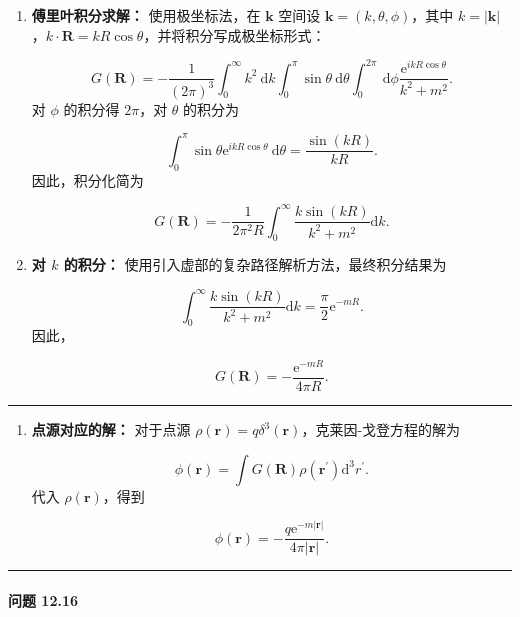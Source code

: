\begin{enumerate}
\def\labelenumi{\arabic{enumi}.}
\item
  \textbf{傅里叶积分求解：} 使用极坐标法，在 $\mathbf{k}$ 空间设
  $\mathbf{k}=(k, \theta, \phi)$，其中
  $k=|\mathbf{k}|$，$k \cdot \mathbf{R}=k R \cos\theta$，并将积分写成极坐标形式：

  $$
  G(\mathbf{R})=-\frac{1}{(2 \pi)^{3}} \int_{0}^{\infty} k^{2} \mathrm{~d} k \int_{0}^{\pi} \sin \theta \mathrm{~d} \theta \int_{0}^{2 \pi} \mathrm{~d} \phi \frac{\mathrm{e}^{i k R \cos \theta}}{k^{2}+m^{2}}.
  $$
  对 $\phi$ 的积分得 $2 \pi$，对 $\theta$ 的积分为

  $$
  \int_{0}^{\pi} \sin \theta \mathrm{e}^{i k R \cos \theta} \mathrm{~d} \theta = \frac{\sin(k R)}{k R}.
  $$
  因此，积分化简为

  $$
  G(\mathbf{R})=-\frac{1}{2 \pi^{2} R} \int_{0}^{\infty} \frac{k \sin(k R)}{k^{2}+m^{2}} \mathrm{d} k.
  $$
\item
  \textbf{对 $k$ 的积分：}
  使用引入虚部的复杂路径解析方法，最终积分结果为

  $$
  \int_{0}^{\infty} \frac{k \sin(k R)}{k^{2}+m^{2}} \mathrm{d} k = \frac{\pi}{2} \mathrm{e}^{-m R}.
  $$
  因此，

  $$
  G(\mathbf{R})=-\frac{\mathrm{e}^{-m R}}{4 \pi R}.
  $$
\end{enumerate}

\begin{center}\rule{0.5\linewidth}{0.5pt}\end{center}

\begin{enumerate}
\def\labelenumi{\arabic{enumi}.}
\setcounter{enumi}{2}
\item
  \textbf{点源对应的解：} 对于点源
  $\rho(\mathbf{r})=q \delta^{3}(\mathbf{r})$，克莱因-戈登方程的解为

  $$
  \phi(\mathbf{r}) = \int G(\mathbf{R}) \rho(\mathbf{r}^{\prime}) \mathrm{d}^{3} r^{\prime}.
  $$
  代入 $\rho(\mathbf{r})$，得到

  $$
  \phi(\mathbf{r}) = -\frac{q \mathrm{e}^{-m |\mathbf{r}|}}{4 \pi |\mathbf{r}|}.
  $$
\end{enumerate}

\begin{center}\rule{0.5\linewidth}{0.5pt}\end{center}

\paragraph{问题 12.16}\label{pro:12.16}

